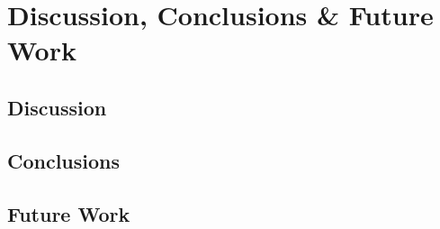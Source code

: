 \chapter{Discussion, Conclusions \& Future Work \label{chap:discussion}}

\section{Discussion}

\section{Conclusions}

\section{Future Work}

